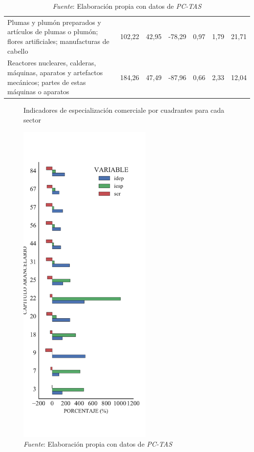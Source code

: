 \documentclass[a4paper,openright,12pt]{book}
\begin{document}
\begin{table}[ht]
{\begin{tabular}{@{}lllllll@{}}
    Plumas y plumón preparados y artículos de plumas o plumón; flores artificiales; manufacturas de cabello       & 102,22 & 42,95    & -78,29  & 0,97  & 1,79  & 21,71 \\
    Reactores nucleares, calderas, máquinas, aparatos y artefactos mecánicos; partes de estas máquinas o aparatos & 184,26 & 47,49    & -87,96  & 0,66  & 2,33  & 12,04 \\ \bottomrule
    \end{tabular}
    }
    \caption*{\textit{Fuente}: Elaboración propia con datos de \textit{PC-TAS}}
\end{table}

\begin{figure}[ht]
    \centering
    \caption{Indicadores de especialización comerciale por cuadrantes para cada sector}
    \includegraphics[width=250px]{esp_c3.pdf}
    \caption*{\textit{Fuente}: Elaboración propia con datos de \textit{PC-TAS}}
    \label{esp_c3}
\end{figure}
\end{document}
